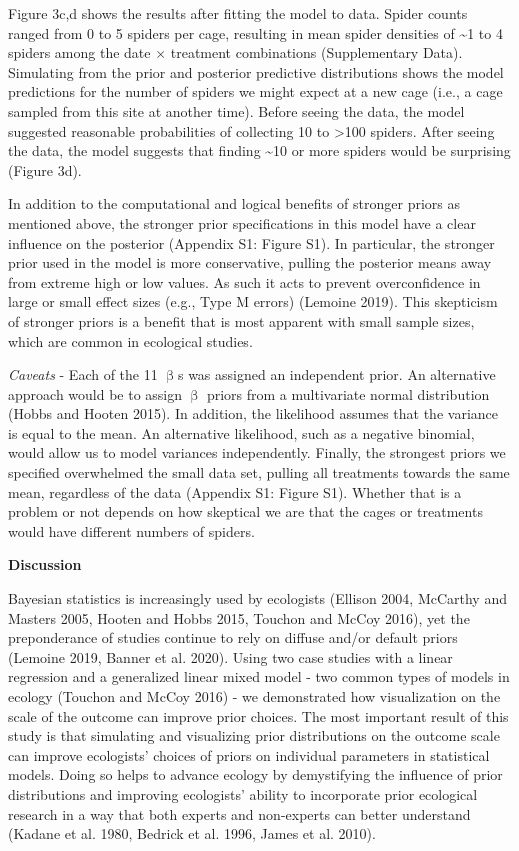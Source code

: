 \documentclass[
  12pt,
]{article}
\begin{document}
Figure 3c,d shows the results after fitting the model to data. Spider
counts ranged from 0 to 5 spiders per cage, resulting in mean spider
densities of \textasciitilde1 to 4 spiders among the date \(\times\)
treatment combinations (Supplementary Data). Simulating from the prior
and posterior predictive distributions shows the model predictions for
the number of spiders we might expect at a new cage (i.e., a cage
sampled from this site at another time). Before seeing the data, the
model suggested reasonable probabilities of collecting 10 to
\textgreater100 spiders. After seeing the data, the model suggests that
finding \textasciitilde10 or more spiders would be surprising (Figure
3d).

In addition to the computational and logical benefits of stronger priors
as mentioned above, the stronger prior specifications in this model have
a clear influence on the posterior (Appendix S1: Figure S1). In
particular, the stronger prior used in the model is more conservative,
pulling the posterior means away from extreme high or low values. As
such it acts to prevent overconfidence in large or small effect sizes
(e.g., Type M errors) (Lemoine 2019). This skepticism of stronger priors
is a benefit that is most apparent with small sample sizes, which are
common in ecological studies.

\emph{Caveats} - Each of the 11 \(\upbeta\)s was assigned an independent
prior. An alternative approach would be to assign \(\upbeta\) priors
from a multivariate normal distribution (Hobbs and Hooten 2015). In
addition, the likelihood assumes that the variance is equal to the mean.
An alternative likelihood, such as a negative binomial, would allow us
to model variances independently. Finally, the strongest priors we
specified overwhelmed the small data set, pulling all treatments towards
the same mean, regardless of the data (Appendix S1: Figure S1). Whether
that is a problem or not depends on how skeptical we are that the cages
or treatments would have different numbers of spiders.

\textbf{Discussion}

Bayesian statistics is increasingly used by ecologists (Ellison 2004,
McCarthy and Masters 2005, Hooten and Hobbs 2015, Touchon and McCoy
2016), yet the preponderance of studies continue to rely on diffuse
and/or default priors (Lemoine 2019, Banner et al. 2020). Using two case
studies with a linear regression and a generalized linear mixed model -
two common types of models in ecology (Touchon and McCoy 2016) - we
demonstrated how visualization on the scale of the outcome can improve
prior choices. The most important result of this study is that
simulating and visualizing prior distributions on the outcome scale can
improve ecologists' choices of priors on individual parameters in
statistical models. Doing so helps to advance ecology by demystifying
the influence of prior distributions and improving ecologists' ability
to incorporate prior ecological research in a way that both experts and
non-experts can better understand (Kadane et al. 1980, Bedrick et al.
1996, James et al. 2010).
\end{document}
